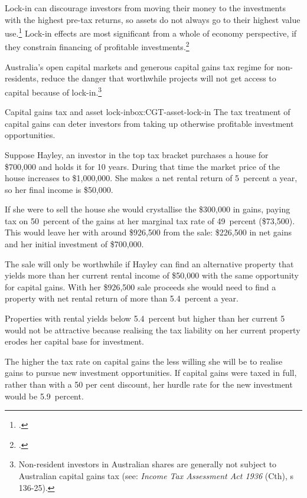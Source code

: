 \documentclass[continuous]{grattan}
\begin{document}
Lock-in can discourage investors from moving their money to the investments with the highest pre-tax returns, so assets do not always go to their highest value use.\footcite{Lindsey1987}  Lock-in effects are most significant from a whole of economy perspective, if they constrain financing of profitable investments.\footcites{OECD2006TaxationOfCapitalGains}{Johnson2008}  

\newcommand{\Act}[2]{\textit{#1} (#2)}
Australia’s open capital markets and generous capital gains tax regime for non-residents, reduce the danger that worthwhile projects will not get access to capital because of lock-in.\footnote{Non-resident investors in Australian shares are generally not subject to Australian capital gains tax (see: \Act{Income Tax Assessment Act 1936}{Cth}, s 136-25). } 


\begin{smallbox}[!hp]{Capital gains tax and asset lock-in}{box:CGT-asset-lock-in}
The tax treatment of capital gains can deter investors from taking up otherwise profitable investment opportunities. 



Suppose Hayley, an investor in the top tax bracket purchases a house for \$700,000 and holds it for 10 years. During that time the market price of the house increases to \$1,000,000. She makes a net rental return of 5~percent a year, so her  final income is \$50,000. 

If she were to sell the house she would crystallise the \$300,000 in gains, paying tax on 50~percent of the gains at her marginal tax rate of 49~percent (\$73,500). This would leave her with around \$926,500 from the sale: \$226,500 in net gains and her initial investment of \$700,000. 

The sale will only be worthwhile if Hayley can find an alternative property that yields more than her current rental income of \$50,000  with the same opportunity for capital gains. With her \$926,500 sale proceeds she would need to find a property with net rental return of more than 5.4~percent a year. 

Properties with rental yields below 5.4~percent but higher than her current 5 would not be attractive because realising the tax liability on her current property erodes her capital base for investment.  

The higher the tax rate on capital gains the less willing she will be to realise gains to pursue new investment opportunities. If capital gains were taxed in full, rather than with a 50 per cent discount, her hurdle rate for the new investment would be 5.9~percent.
\end{smallbox}
\end{document}
